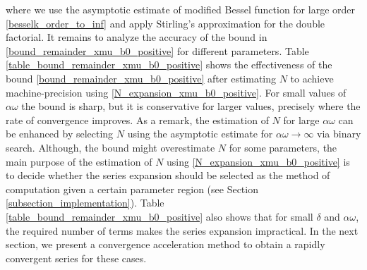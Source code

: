 \documentclass[10pt,a4paper,oneside]{article}
\numberwithin{equation}{section}
\begin{document}
where we use the asymptotic estimate of modified Bessel function for large order \eqref{besselk_order_to_inf} and apply Stirling's approximation for the double factorial. It remains to analyze the accuracy of the bound in \eqref{bound_remainder_xmu_b0_positive} for different parameters. Table \ref{table_bound_remainder_xmu_b0_positive} shows the effectiveness of the bound \eqref{bound_remainder_xmu_b0_positive} after estimating $N$ to achieve machine-precision using \eqref{N_expansion_xmu_b0_positive}. For small values of $\alpha\omega$ the bound is sharp, but it is conservative for larger values, precisely where the rate of convergence improves. As a remark, the estimation of $N$ for large $\alpha\omega$ can be enhanced by selecting $N$ using the asymptotic estimate for $\alpha\omega \to \infty$ via binary search. Although, the bound might overestimate $N$ for some parameters, the main purpose of the estimation of $N$ using \eqref{N_expansion_xmu_b0_positive} is to decide whether the series expansion should be selected as the method of computation given a certain parameter region (see Section \ref{subsection_implementation}). Table \ref{table_bound_remainder_xmu_b0_positive} also shows that for small $\delta$ and $\alpha\omega$, the required number of terms makes the series expansion impractical. In the next section, we present a convergence acceleration method to obtain a rapidly convergent series for these cases.

\begin{table}[H]
	\centering
	\caption{The remainder of the series expansion  \eqref{expansion_xmu_b0_positive} and bound \eqref{bound_remainder_xmu_b0_positive}, estimating $N$ using \eqref{N_expansion_xmu_b0_positive} to achieve machine precision.}
	\label{table_bound_remainder_xmu_b0_positive}
\end{table}
\end{document}
